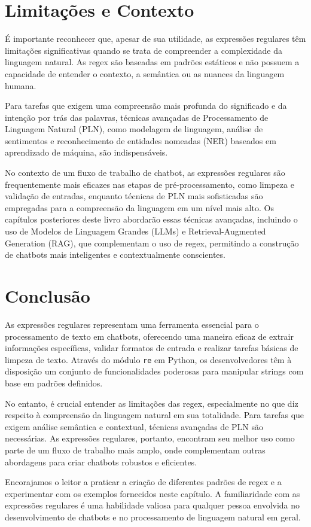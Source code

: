 \documentclass[14pt,a4paper,oneside]{book}
\begin{document}
\section{Limitações e Contexto}
É importante reconhecer que, apesar de sua utilidade, as expressões regulares têm limitações significativas quando se trata de compreender a complexidade da linguagem natural. As regex são baseadas em padrões estáticos e não possuem a capacidade de entender o contexto, a semântica ou as nuances da linguagem humana.

Para tarefas que exigem uma compreensão mais profunda do significado e da intenção por trás das palavras, técnicas avançadas de Processamento de Linguagem Natural (PLN), como modelagem de linguagem, análise de sentimentos e reconhecimento de entidades nomeadas (NER) baseados em aprendizado de máquina, são indispensáveis.

No contexto de um fluxo de trabalho de chatbot, as expressões regulares são frequentemente mais eficazes nas etapas de pré-processamento, como limpeza e validação de entradas, enquanto técnicas de PLN mais sofisticadas são empregadas para a compreensão da linguagem em um nível mais alto. Os capítulos posteriores deste livro abordarão essas técnicas avançadas, incluindo o uso de Modelos de Linguagem Grandes (LLMs) e Retrieval-Augmented Generation (RAG), que complementam o uso de regex, permitindo a construção de chatbots mais inteligentes e contextualmente conscientes.

\section{Conclusão}
As expressões regulares representam uma ferramenta essencial para o processamento de texto em chatbots, oferecendo uma maneira eficaz de extrair informações específicas, validar formatos de entrada e realizar tarefas básicas de limpeza de texto. Através do módulo \texttt{re} em Python, os desenvolvedores têm à disposição um conjunto de funcionalidades poderosas para manipular strings com base em padrões definidos.

No entanto, é crucial entender as limitações das regex, especialmente no que diz respeito à compreensão da linguagem natural em sua totalidade. Para tarefas que exigem análise semântica e contextual, técnicas avançadas de PLN são necessárias. As expressões regulares, portanto, encontram seu melhor uso como parte de um fluxo de trabalho mais amplo, onde complementam outras abordagens para criar chatbots robustos e eficientes.

Encorajamos o leitor a praticar a criação de diferentes padrões de regex e a experimentar com os exemplos fornecidos neste capítulo. A familiaridade com as expressões regulares é uma habilidade valiosa para qualquer pessoa envolvida no desenvolvimento de chatbots e no processamento de linguagem natural em geral.




\end{document}
